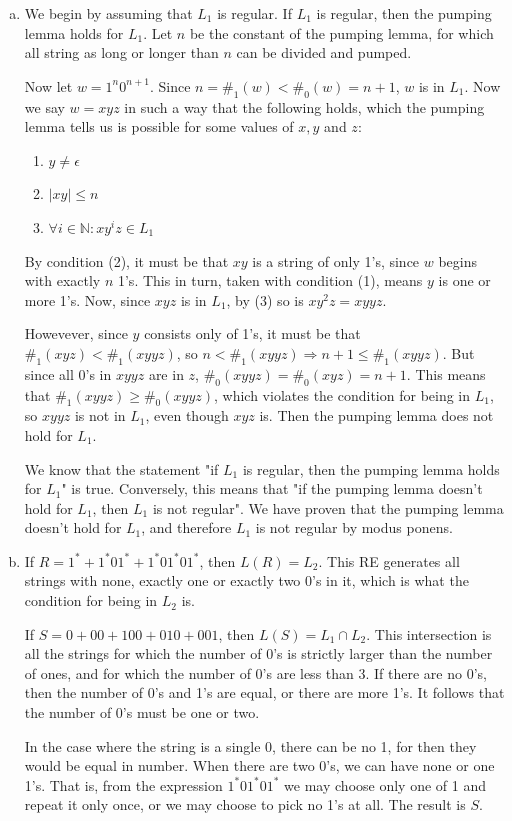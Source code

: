\documentclass{article}
\begin{document}
\begin{enumerate}[(a)]
    \item
        We begin by assuming that $L_1$ is regular. If $L_1$ is regular, then the pumping lemma holds for $L_1$. Let $n$ be the constant of the pumping lemma, for which all string as long or longer than $n$ can be divided and pumped.

        Now let $w = 1^n0^{n+1}$. Since $n = \#_1(w) < \#_0(w) = n+1$, $w$ is in $L_1$. Now we say $w =xyz$ in such a way that the following holds, which the pumping lemma tells us is possible for some values of $x,y$ and $z$:

        \begin{enumerate}[(1)]
            \item $y \neq \epsilon$
            \item $|xy| \leq n$
            \item $\forall i \in \mathbb{N}: xy^iz \in L_1$
        \end{enumerate}

        By condition (2), it must be that $xy$ is a string of only 1's, since $w$ begins with exactly $n$ 1's. This in turn, taken with condition (1), means $y$ is one or more 1's. Now, since $xyz$ is in $L_1$, by (3) so is $xy^2z = xyyz$.

        Howevever, since $y$ consists only of 1's, it must be that $\#_1(xyz) < \#_1(xyyz)$, so $ n < \#_1(xyyz) \Rightarrow n + 1 \leq \#_1(xyyz)$. But since all 0's in $xyyz$ are in $z$, $\#_0(xyyz) = \#_0(xyz) = n + 1$. This means that $\#_1(xyyz) \geq \#_0(xyyz)$, which violates the condition for being in $L_1$, so $xyyz$ is not in $L_1$, even though $xyz$ is. Then the pumping lemma does not hold for $L_1$.

        We know that the statement "if $L_1$ is regular, then the pumping lemma holds for $L_1$" is true. Conversely, this means that "if the pumping lemma doesn't hold for $L_1$, then $L_1$ is not regular". We have proven that the pumping lemma doesn't hold for $L_1$, and therefore $L_1$ is not regular by modus ponens.


    \item
        If $R = 1^* + 1^*01^* + 1^*01^*01^*$, then $L(R) = L_2$. This RE generates all strings with none, exactly one or exactly two 0's in it, which is what the condition for being in $L_2$ is.

        If $S = 0 + 00 + 100 + 010 + 001$, then $L(S) = L_1 \cap L_2$. This intersection is all the strings for which the number of 0's is strictly larger than the number of ones, and for which the number of 0's are less than 3. If there are no 0's, then the number of 0's and 1's are equal, or there are more 1's. It follows that the number of 0's must be one or two. 
        
        In the case where the string is a single 0, there can be no 1, for then they would be equal in number. When there are two 0's, we can have none or one 1's. That is, from the expression $1^*01^*01^*$ we may choose only one of 1 and repeat it only once, or we may choose to pick no 1's at all. The result is $S$.
\end{enumerate}
\end{document}
